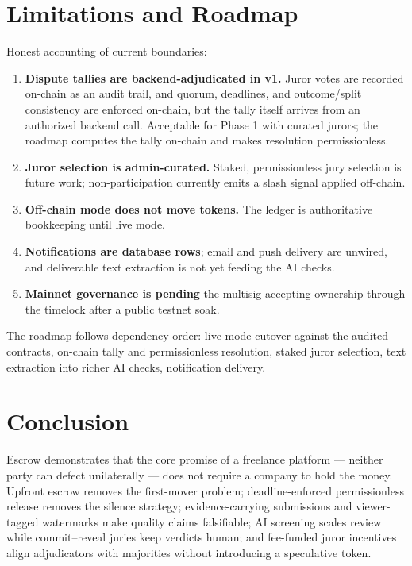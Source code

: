 \documentclass[11pt,letterpaper]{article}
\begin{document}
\section{Limitations and Roadmap}\label{sec:roadmap}

Honest accounting of current boundaries:

\begin{enumerate}
\item \textbf{Dispute tallies are backend-adjudicated in v1.} Juror votes are recorded
on-chain as an audit trail, and quorum, deadlines, and outcome/split consistency are
enforced on-chain, but the tally itself arrives from an authorized backend call.
Acceptable for Phase 1 with curated jurors; the roadmap computes the tally on-chain
and makes resolution permissionless.
\item \textbf{Juror selection is admin-curated.} Staked, permissionless jury selection
is future work; non-participation currently emits a slash signal applied off-chain.
\item \textbf{Off-chain mode does not move tokens.} The ledger is authoritative
bookkeeping until live mode.
\item \textbf{Notifications are database rows}; email and push delivery are unwired,
and deliverable text extraction is not yet feeding the AI checks.
\item \textbf{Mainnet governance is pending} the multisig accepting ownership through
the timelock after a public testnet soak.
\end{enumerate}

The roadmap follows dependency order: live-mode cutover against the audited
contracts, on-chain tally and permissionless resolution, staked juror selection, text
extraction into richer AI checks, notification delivery.

\section{Conclusion}

Escrow demonstrates that the core promise of a freelance platform --- neither party
can defect unilaterally --- does not require a company to hold the money. Upfront
escrow removes the first-mover problem; deadline-enforced permissionless release
removes the silence strategy; evidence-carrying submissions and viewer-tagged
watermarks make quality claims falsifiable; AI screening scales review while
commit--reveal juries keep verdicts human; and fee-funded juror incentives align
adjudicators with majorities without introducing a speculative token.
\end{document}
